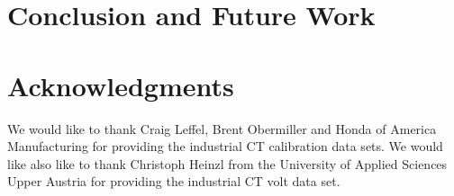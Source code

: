 
\section{Conclusion and Future Work}


\section{Acknowledgments}

We would like to thank Craig Leffel, Brent Obermiller 
and Honda of America Manufacturing
for providing the industrial CT calibration data sets.
We would like also like to thank Christoph Heinzl
from the University of Applied Sciences Upper Austria
for providing the industrial CT volt data set.

